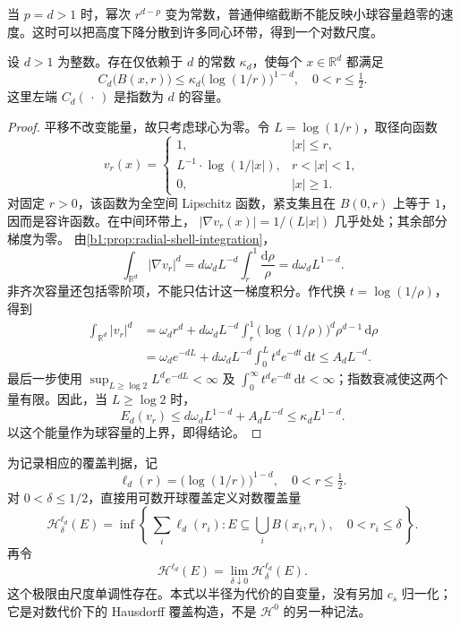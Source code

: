 当 \(p=d>1\) 时，幂次 \(r^{d-p}\) 变为常数，普通伸缩截断不能反映小球容量趋零的速度。这时可以把高度下降分散到许多同心环带，得到一个对数尺度。

\begin{proposition}\label{b1:prop:critical-logarithmic-capacity}
设 \(d>1\) 为整数。存在仅依赖于 \(d\) 的常数 \(\kappa_d\)，使每个 \(x\in\mathbb R^d\) 都满足
\[
 C_d\bigl(B(x,r)\bigr)
 \leq\kappa_d\bigl(\log(1/r)\bigr)^{1-d},
 \quad 0<r\leq\tfrac12.
\]
这里左端 \(C_d(\,\cdot\,)\) 是指数为 \(d\) 的容量。
\end{proposition}
\begin{proof}
平移不改变能量，故只考虑球心为零。令 \(L=\log(1/r)\)，取径向函数
\[
 v_r(x)=
 \begin{cases}
 1,&|x|\leq r,\\
 L^{-1}\cdot \log(1/|x|),&r<|x|<1,\\
 0,&|x|\geq1.
 \end{cases}
\]
对固定 \(r>0\)，该函数为全空间 Lipschitz 函数，紧支集且在
\(B(0,r)\) 上等于 \(1\)，因而是容许函数。在中间环带上，
\(|\nabla v_r(x)|=1/(L|x|)\) 几乎处处；其余部分梯度为零。
由\cref{b1:prop:radial-shell-integration}，
\[
 \int_{\mathbb R^d}|\nabla v_r|^d
 =d\omega_d L^{-d}\int_r^1\frac{\mathrm d\rho}{\rho}
 =d\omega_d L^{1-d}.
\]
非齐次容量还包括零阶项，不能只估计这一梯度积分。作代换
\(t=\log(1/\rho)\)，得到
\[
 \begin{aligned}
 \int_{\mathbb R^d}|v_r|^d
 &=\omega_dr^d+d\omega_dL^{-d}
       \int_r^1\bigl(\log(1/\rho)\bigr)^d\rho^{d-1}\,\mathrm d\rho\\
 &=\omega_de^{-dL}
   +d\omega_dL^{-d}\int_0^L t^de^{-dt}\,\mathrm dt
 \leq A_dL^{-d}.
 \end{aligned}
\]
最后一步使用
\(\sup_{L\geq\log2}L^de^{-dL}<\infty\) 及
\(\int_0^\infty t^de^{-dt}\,\mathrm dt<\infty\)；指数衰减使这两个量有限。因此，当 \(L\geq\log2\) 时，
\[
 E_d(v_r)\leq d\omega_dL^{1-d}+A_dL^{-d}
 \leq\kappa_dL^{1-d}.
\]
以这个能量作为球容量的上界，即得结论。
\end{proof}

为记录相应的覆盖判据，记
\[
 \ell_d(r)=\bigl(\log(1/r)\bigr)^{1-d},
 \quad 0<r\leq\tfrac12.
\]
对 \(0<\delta\leq1/2\)，直接用可数开球覆盖定义对数覆盖量
\[
 \mathcal H^{\ell_d}_\delta(E)
 =\inf\left\{\,
    \sum_i\ell_d(r_i):
    E\subseteq\bigcup_i B(x_i,r_i),\quad 0<r_i\leq\delta
   \,\right\}.
\]
再令
\[
 \mathcal H^{\ell_d}(E)
 =\lim_{\delta\downarrow0}\mathcal H^{\ell_d}_\delta(E).
\]
这个极限由尺度单调性存在。本式以半径为代价的自变量，没有另加
\(c_s\) 归一化；它是对数代价下的 Hausdorff 覆盖构造，不是
\(\mathcal H^0\) 的另一种记法。

